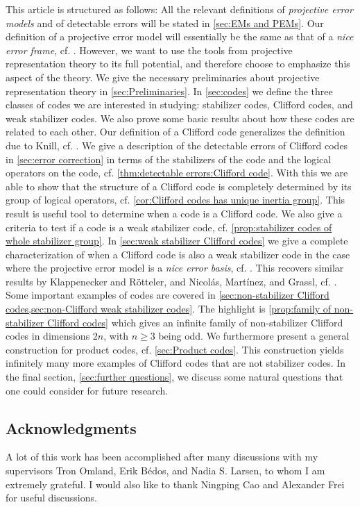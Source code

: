 \documentclass[11pt, oneside, reqno]{amsart}
\theoremstyle{definition}
\theoremstyle{plain}
\theoremstyle{remark}
\begin{document}
This article is structured as follows: All the relevant definitions of \emph{projective error models} and of detectable errors will be stated in \cref{sec:EMs and PEMs}. Our definition of a projective error model will essentially be the same as that of a \emph{nice error frame}, cf. \cite{ChienWaldron17}. However, we want to use the tools from projective representation theory to its full potential, and therefore choose to emphasize this aspect of the theory. We give the necessary preliminaries about projective representation theory in \cref{sec:Preliminaries}. In \cref{sec:codes} we define the three classes of codes we are interested in studying: stabilizer codes, Clifford codes, and weak stabilizer codes. We also prove some basic results about how these codes are related to each other. Our definition of a Clifford code generalizes the definition due to Knill, cf. \cite{KnillI96}. We give a description of the detectable errors of Clifford codes in \cref{sec:error correction} in terms of the stabilizers of the code and the logical operators on the code, cf. \cref{thm:detectable errors:Clifford code}. With this we are able to show that the structure of a Clifford code is completely determined by its group of logical operators, cf. \cref{cor:Clifford codes has unique inertia group}. This result is useful tool to determine when a code is a Clifford code. We also give a criteria to test if a code is a weak stabilizer code, cf. \cref{prop:stabilizer codes of whole stabilizer group}. In \cref{sec:weak stabilizer Clifford codes} we give a complete characterization of when a Clifford code is also a weak stabilizer code in the case where the projective error model is a \emph{nice error basis}, cf. \cite{KnillI96}. This recovers similar results by Klappenecker and R{\"o}tteler, and Nicolás, Martínez, and Grassl, cf. \cite{KlappeneckerRötteler04,GrasslMartínezNicolás10}. Some important examples of codes are covered in \cref{sec:non-stabilizer Clifford codes,sec:non-Clifford weak stabilizer codes}. The highlight is \cref{prop:family of non-stabilizer Clifford codes} which gives an infinite family of non-stabilizer Clifford codes in dimensions $2n$, with $n \geq 3$ being odd. We furthermore present a general construction for product codes, cf. \cref{sec:Product codes}. This construction yields infinitely many more examples of Clifford codes that are not stabilizer codes. In the final section, \cref{sec:further questions}, we discuss some natural questions that one could consider for future research.

\subsection*{Acknowledgments}
A lot of this work has been accomplished after many discussions with my supervisors Tron Omland, Erik B{\'e}dos, and Nadia S. Larsen, to whom I am extremely grateful. I would also like to thank Ningping Cao and Alexander Frei for useful discussions.
\end{document}
